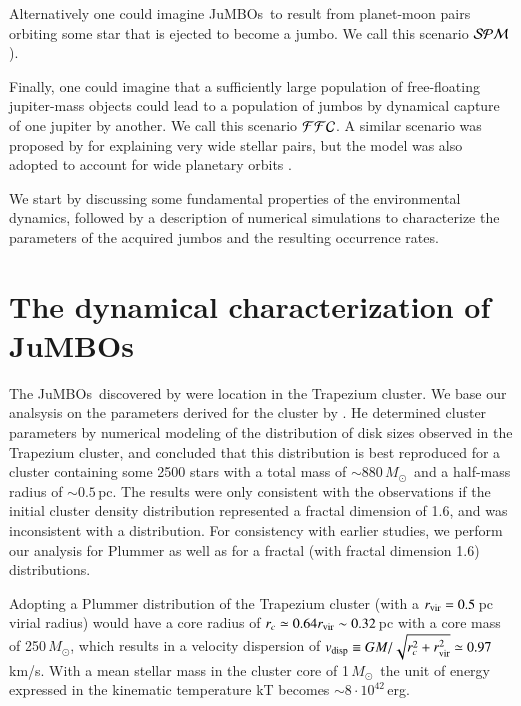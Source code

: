 \documentclass[aa]{lib/aa}
\newcommand{\MSun}{\mbox{${M}_\odot$}}
\newcommand{\jumbos}{\mbox{JuMBOs}}
\begin{document}
Alternatively one could imagine \jumbos\, to result from planet-moon
pairs orbiting some star that is ejected to become a jumbo.  We call
this scenario ${\cal SPM}$).

Finally, one could imagine that a sufficiently large population
of free-floating jupiter-mass objects could lead to a population of
jumbos by dynamical capture of one jupiter by another.  We call this
scenario ${\cal FFC}$. A similar scenario was proposed by
\cite{2010MNRAS.404.1835K} for explaining very wide stellar pairs, but
the model was also adopted to account for wide planetary orbits
\citep{2012ApJ...750...83P}.

We start by discussing some fundamental properties of the
environmental dynamics, followed by a description of numerical
simulations to characterize the parameters of the acquired jumbos and
the resulting occurrence rates.

\section{The dynamical characterization of \jumbos}

The \jumbos\, discovered by \cite{2023arXiv231001231P} were location
in the Trapezium cluster. We base our analsysis on the parameters
derived for the cluster by \cite{2016MNRAS.457..313P}.  He determined
cluster parameters by numerical modeling of the distribution of disk
sizes observed in the Trapezium cluster, and concluded that this
distribution is best reproduced for a cluster containing some 2500
stars with a total mass of $\sim 880$\,\MSun\, and a half-mass radius
of $\sim 0.5$\,pc. The results were only consistent with the
observations if the initial cluster density distribution represented a
fractal dimension of 1.6, and was inconsistent with a
\cite{1911MNRAS..71..460P} distribution.  For consistency with earlier
studies, we perform our analysis for Plummer as well as for a fractal
(with fractal dimension 1.6) distributions.

Adopting a Plummer distribution of the Trapezium cluster (with a
$r_{\rm vir} = 0.5$\,pc virial radius) would have a core radius of
$r_c \simeq 0.64r_{\rm vir} \sim 0.32$\,pc with a core mass of
250\,\MSun, which results in a velocity dispersion of $v_{\rm disp}
\equiv GM/\sqrt{r_c^2 + r_{\rm vir}^2} \simeq 0.97$\,km/s. With a
mean stellar mass in the cluster core of 1\,\MSun\, the unit of energy
expressed in the kinematic temperature kT becomes $\sim 8 \cdot
10^{42}$\,erg.
\end{document}
